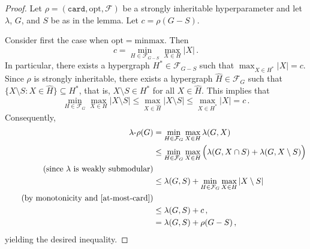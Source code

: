 \documentclass[10pt,a4paper]{amsart}
\newcommand{\opt}{\mathrm{opt}}
\begin{document}
\begin{proof}
Let $\rho=(\mathtt{card},\opt,\mathcal{F})$ be a strongly inheritable  hyperparameter and let $\lambda$, $G$, and $S$ be as in the lemma.
Let $c = \rho(G-S)$.

Consider first the case when $\mathrm{opt}= \mathrm{minmax}$.
Then
\[c = \min_{H \in \mathcal{F}_{G-S}} \max_{X \in H} |X|\,.\]
In particular, there exists a hypergraph $H^* \in \mathcal{F}_{G-S}$ such that $\max_{X \in H^*} |X| = c$.
Since $\rho$ is strongly inheritable, there exists a hypergraph $\widehat H\in \mathcal{F}_{G}$ such that $\{X\setminus S\colon X\in \widehat H\} \subseteq H^*$, that is, $X\setminus S\in H^*$ for all $X\in \widehat H$.
This implies that 
\[\min_{H \in \mathcal{F}_{G}} \max_{X \in H} |X\setminus S| \le \max_{X \in \widehat{H}} |X\setminus S|\le \max_{X \in H^*} |X| = c\,.\]
Consequently, 
\begin{alignat*}{2}
\lambda\text{-}\rho(G) & = \min_{H \in \mathcal{F}_{G}} \max_{X \in H} \lambda(G,X) \\
&\le \min_{H \in \mathcal{F}_{G}} \max_{X \in H} \Big(\lambda(G,X \cap S) + \lambda(G,X\setminus S)\Big)\\ \tag*{\text{(since $\lambda$ is weakly submodular)}} \\
&\le \lambda(G,S) + \min_{H \in \mathcal{F}_{G}} \max_{X \in H} |X\setminus S|\\ \tag*{\text{(by monotonicity and \Cref{at-most-card})}} \\
&\le \lambda(G,S) +c\,,\\
&= \lambda(G,S) +\rho(G-S)\,,
\end{alignat*}
yielding the desired inequality.


\end{proof}
\end{document}
